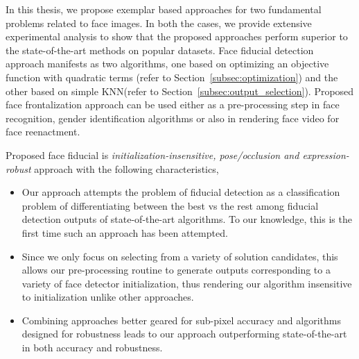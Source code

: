 % 


In this thesis, we propose exemplar based approaches for two fundamental problems
related to face images. In both the cases, we provide extensive experimental 
analysis to show that the proposed approaches perform superior to the 
state-of-the-art methods on popular datasets. Face fiducial detection approach 
manifests as two algorithms, one based on optimizing an objective function with 
quadratic terms (refer to Section~\ref{subsec:optimization}) and the other based on simple KNN(refer to Section~\ref{subsec:output_selection}). Proposed face frontalization
approach can be used either as a pre-processing step in face recognition, gender
identification algorithms or also in rendering face video for face reenactment.

Proposed face fiducial is \textit{initialization-insensitive, pose/occlusion and
expression-robust} approach with the following characteristics,
\begin{itemize}
\item{Our approach attempts the problem of fiducial detection 
as a classification problem of differentiating between 
the best vs the rest among fiducial detection outputs of 
state-of-the-art algorithms. To our knowledge, this is the 
first time such an approach has been attempted.}
\item{Since we only focus on selecting from a variety of solution 
candidates, this allows our pre-processing routine 
to generate outputs corresponding to a variety of face 
detector initialization, thus rendering our algorithm 
insensitive to initialization unlike other approaches.}
\item{Combining approaches better geared for sub-pixel accuracy 
and algorithms designed for robustness leads to our 
approach outperforming state-of-the-art in both accuracy 
and robustness.}
\end{itemize}

